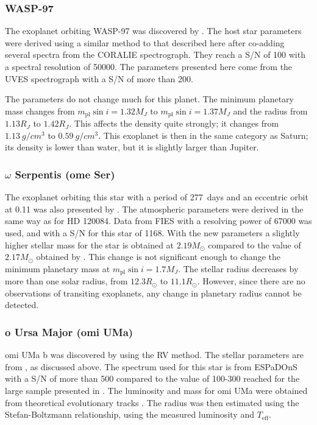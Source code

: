 \subsubsection{WASP-97}
\label{sub:WASP-97}

The exoplanet orbiting WASP-97 was discovered by \citet{Hellier2014}. The host star parameters were
derived using a similar method to that described here after co-adding several spectra from the
CORALIE spectrograph. They reach a S/N of 100 with a spectral resolution of \num{50000}. The
parameters presented here come from the UVES spectrograph with a S/N of more than 200.

The parameters do not change much for this planet. The minimum planetary mass changes from
$m_\mathrm{pl}\sin i=1.32M_J$ to $m_\mathrm{pl}\sin i=1.37M_J$ and the radius from $1.13R_J$ to
$1.42R_J$. This affects the density quite strongly; it changes from $\SI{1.13}{g/cm^3}$ to
$\SI{0.59}{g/cm^3}$. This exoplanet is then in the same category as Saturn; its density is lower
than water, but it is slightly larger than Jupiter.

\subsubsection{\texorpdfstring{$\omega$}{o} Serpentis (ome Ser)}
\label{sub:ome_Ser}

The exoplanet orbiting this star with a period of \SI{277}{days} and an eccentric orbit at 0.11 was
also presented by \citet{Sato2013}. The atmospheric parameters were derived in the same way as for
HD 120084. Data from FIES with a resolving power of \num{67000} was used, and with a S/N for this
star of 1168. With the new parameters a slightly higher stellar mass for the star is obtained at
$2.19M_\odot$ compared to the value of $2.17M_\odot$ obtained by \cite{Takeda2008}. This change is
not significant enough to change the minimum planetary mass at $m_\mathrm{pl}\sin i=1.7M_J$. The
stellar radius decreases by more than one solar radius, from $12.3R_\odot$ to $11.1R_\odot$.
However, since there are no observations of transiting exoplanets, any change in planetary radius
cannot be detected.



\subsubsection{o Ursa Major (omi UMa)}
\label{sub:omiUMa}

omi UMa b was discovered by \citet{Sato2012} using the RV method. The stellar parameters are from
\citet{Takeda2008}, as discussed above. The spectrum used for this star is from ESPaDOnS with a S/N
of more than 500 compared to the value of 100-300 reached for the large sample presented in
\citet{Takeda2008}. The luminosity and mass for omi UMa were obtained from theoretical evolutionary
tracks \citep[see][and references therein]{Sato2012}. The radius was then estimated using the
Stefan-Boltzmann relationship, using the measured luminosity and $T_\mathrm{eff}$.

